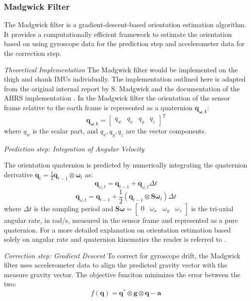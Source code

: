 \subsubsection{Madgwick Filter}

The Madgwick filter is a gradient-descent-based orientation estimation algorithm. It provides a computationally efficient framework to estimate the orientation based on using gyroscope data for the prediction step and accelerometer data for the correction step. 

\textit{Theoretical Implementation}
The Madgwick filter would be implemented on the thigh and shank IMUs individually. The implementation outlined here is adapted from the original internal report by S. Madgwick  \cite{madgwick_ecient_nodate} and the documentation of the AHRS implementation \cite{noauthor_madgwick_nodate}. In the Madgwick filter the orientation of the sensor frame relative to the earth frame is represented as a quaternion \( \mathbf{q_{\omega , t}} \):
\[
\mathbf{q_{\omega , t}} = 
\begin{bmatrix}
q_w & q_x & q_y & q_z
\end{bmatrix}^T
\]
where \( q_w \) is the scalar part, and \( q_x, q_y, q_z \) are the vector components.

\textit{Prediction step: Integration of Angular Velocity}

The orientation quaternion is predicted by numerically integrating the quaternion derivative 
\(
\dot{\mathbf{q}}_t = \frac{1}{2} \mathbf{q}_{t-1} \otimes \boldsymbol{\omega}_t
\) as:
\[
\mathbf{q}_{\omega, t} = \mathbf{q}_{t-1} + \dot{\mathbf{q}}_{\omega, t} \Delta t
\]
\[
\mathbf{q}_{\omega, t} = \mathbf{q}_{t-1} + \frac{1}{2} \left( \mathbf{q}_{t-1} \otimes \mathbf{S}\boldsymbol{\omega}_t \right) \Delta t
\]
where \( \Delta t \) is the sampling period and 
\(
\mathbf{S}\boldsymbol{\omega} = 
\begin{bmatrix}
0 & \omega_x & \omega_y & \omega_z
\end{bmatrix}
\)
is the tri-axial angular rate, in rad/s, measured in the sensor frame and represented as a pure quaternion. For a more detailed explanation on orientation estimation based solely on angular rate and quaternion kinematics the reader is referred to \cite{sola_quaternion_2017}.

\textit{Correction step: Gradient Descent}
To correct for gyroscope drift, the Madgwick filter uses accelerometer data to align the predicted gravity vector with the measure gravity vector. The objective funciton minimizes the error between the two:
\[
f(\mathbf{q}) = \mathbf{q}^* \otimes \mathbf{g} \otimes \mathbf{q} - \mathbf{a}
\]

